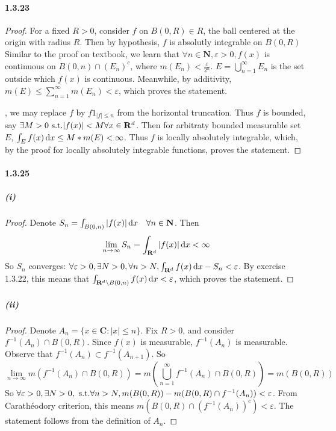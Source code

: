 \documentclass{article}
\begin{document}
\paragraph{1.3.23}

\begin{proof}
For a fixed $R>0$, consider $f$ on $B(0,R)\in R$, the ball centered at the origin with radius $R$. Then by hypothesis, $f$ is absolutly integrable on $B(0,R)$
Similar to the proof on textbook, we learn that $\forall n\in\mathbf{N}, \varepsilon>0, f(x)$ is continuous on $B(0,n)\cap (E_n)^c$, where $m(E_n)<\frac{\varepsilon}{2^n}$. $E=\bigcup\limits_{n=1}^{\infty}E_n$ is the set outside which $f(x)$ is continuous. Meanwhile, by additivity, $m(E)\leq \sum\limits_{n=1}^{\infty}m(E_n)<\varepsilon$, which proves the statement. 

\WLOG, we may replace $f$ by $f1_{|f|\leq n}$ from the horizontal truncation. Thus $f$ is bounded, say $\exists M>0\text{ s.t.}|f(x)|<M \forall x\in\mathbf{R}^d$. Then for arbitraty bounded measurable set $E$, $\int_{E}f(x)\,\mathrm{d} x\leq M*m(E)<\infty$. Thus $f$ is locally absolutely integrable, which, by the proof for locally absolutely integrable functions, proves the statement.
\end{proof}

\paragraph{1.3.25}
\subparagraph{(i)}
\begin{proof}
Denote $S_n=\int_{B(0,n)}|f(x)|\,\mathrm{d} x \quad \forall n\in\mathbf{N}$. Then 
\[\lim_{n\to\infty}S_n=\int_{\mathbf{R}^d} |f(x)|\,\mathrm{d} x<\infty\]
So $S_n$ converges: $\forall \varepsilon>0, \exists N>0, \forall n>N, \int_{\mathbf{R}^d} f(x)\,\mathrm{d} x-S_n<\varepsilon$. By exercise 1.3.22, this means that $\int_{\mathbf{R}^d\backslash B(0,n)}f(x)\,\mathrm{d} x<\varepsilon$, which proves the statement.
\end{proof}
\subparagraph{(ii)}
\begin{proof}
Denote $A_n=\{x\in\mathbf{C}: |x|\leq n\}$. Fix $R>0$, and consider $f^{-1}(A_n)\cap B(0,R)$. Since $f(x)$ is measurable, $f^{-1}(A_n)$ is measurable. Observe that $f^{-1}(A_n)\subset f^{-1}(A_{n+1})$. So
\[\lim\limits_{n\to\infty}m(f^{-1}(A_n)\cap B(0,R))=m(\bigcup\limits_{n=1}^{\infty}f^{-1}(A_n)\cap B(0,R))=m(B(0,R))\]
So $\forall \varepsilon>0,\exists N>0,\text{ s.t.} \forall n>N, m(B(0,R))-m(B(0,R)\cap f^{-1}(A_n))<\varepsilon$. From Carath\'eodory criterion, this means $m(B(0,R)\cap (f^{-1}(A_n))^c)<\varepsilon$. The statement follows from the definition of $A_n$.
\end{proof}
\end{document}
